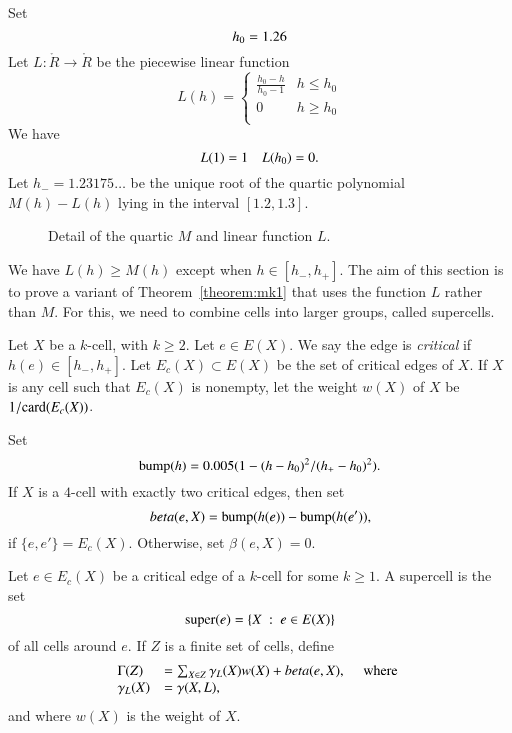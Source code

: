\begin{definition}
Set
$$
  h_0 = 1.26\\  %
$$
Let $L:\ring{R}\to\ring{R}$ be the piecewise linear function 
$$
L(h) = \begin{cases}
\frac{h_0-h}{h_0-1} & h \le h_0 \\
0 & h\ge h_0 \\
\end{cases}
$$
We have
$$
L(1) = 1\quad L(\hm) = 0.
$$
Let $h_- = 1.23175\ldots$ be the unique root of the quartic polynomial
$M(h)-L(h)$ lying in the interval $[1.2,1.3]$.
\end{definition}

\begin{figure}[htb]
  \centering
  \caption{Detail of the quartic $M$ and linear function $L$.}
  \label{fig:L}
\end{figure}

We have $L(h)\ge M(h)$ except when $h\in [h_-,h_+]$.  The aim of this section is to prove a variant of Theorem~\ref{theorem:mk1} that uses the function $L$ rather than $M$.  For this, we need to combine cells into larger groups, called supercells.

\begin{definition}
Let $X$ be a $k$-cell, with $k\ge 2$.  Let $e\in E(X)$.
We say the edge is {\it critical} if $h(e)\in[h_-,h_+]$.
Let $E_c(X)\subset E(X)$ be the set of critical edges of $X$.  If $X$ is any cell such that $E_c(X)$ is nonempty, let the weight $w(X)$ of $X$  
be $1/\op{card}(E_c(X))$.
\end{definition}

\begin{definition}[$\beta$]  Set 
$$
\op{bump}(h) = 0.005 (1 - (h-h_0)^2/(h_+-h_0)^2).
$$
If $X$ is a $4$-cell with exactly two critical edges, then set
$$
\beta(e,X) = \op{bump}(h(e)) - \op{bump}(h(e')),
$$
if $\{e,e'\} = E_c(X)$.  Otherwise, set $\beta(e,X) = 0$.
\end{definition}

\begin{definition}
Let $e\in E_c(X)$ be a critical edge of a $k$-cell for some $k\ge 1$.
A supercell is the set 
$$
\op{super}(e) = \{X\mid e\in E(X)\} 
$$
of all cells around $e$. 
If $Z$ is a finite set of cells, define
$$
\begin{array}{lll}
\Gamma(Z) &= \sum_{X\in Z} \gamma_L(X) w(X) +\beta(e,X),\quad\hbox{ where }\\
\gamma_L(X) &= \gamma(X,L),
\end{array}
$$
and where $w(X)$ is the weight of $X$.

\end{definition}

